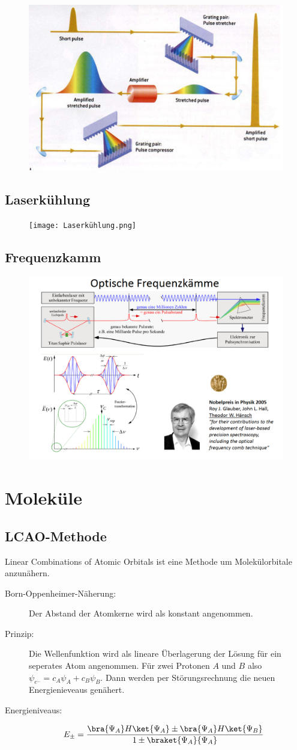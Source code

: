 \documentclass[twocolumn]{summery_4.1}
\begin{document}
\begin{figure}[H]
    \centering
    \includegraphics[width=.49\textwidth]{Kurzer_Puls.png}
\end{figure}

\subsection{Laserkühlung}
\begin{figure}[H]
    \centering
    \texttt{[image: Laserkühlung.png]}
\end{figure}

\subsection{Frequenzkamm}
\begin{figure}[H]
    \centering
    \includegraphics[width=.49\textwidth]{Frequenzkamm.png}
\end{figure}

\section{Moleküle}
\subsection{LCAO-Methode}
{\large L}inear {\large C}ombinations of {\large Atomic} {\large O}rbitals ist eine Methode um Molekülorbitale anzunähern.
\begin{description}
    \item[Born-Oppenheimer-Näherung:] Der Abstand der Atomkerne wird als konstant angenommen.
    \item[Prinzip:] Die Wellenfunktion wird als lineare Überlagerung der Lösung für ein seperates Atom angenommen. Für zwei Protonen \(A\) und \(B\) also \(\psi_{e^-} = c_A\psi_A + c_B \psi_B\). Dann werden per Störungsrechnung die neuen Energienieveaus genähert.
    \item[Energieniveaus:]
    \begin{align*}
        E_\pm &= \frac{\bra{\Psi_A}H\ket{\Psi_A} \pm \bra{\Psi_A}H\ket{\Psi_B}}{1\pm \braket{\Psi_A}{\Psi_A}}
    \end{align*} 
\end{description}
\end{document}
